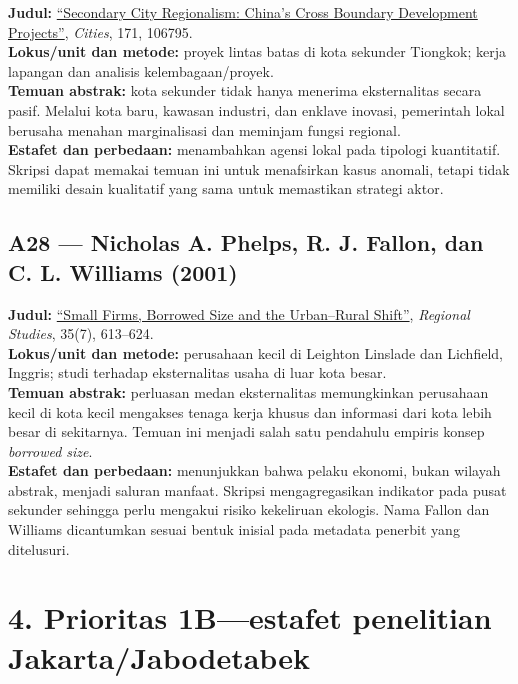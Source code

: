 \documentclass[
  indonesian,
  11pt,
  a4paper,
  oneside,
  openany]{report}
\begin{document}
\textbf{Judul:}
\href{https://doi.org/10.1016/j.cities.2026.106795}{``Secondary City
Regionalism: China's Cross Boundary Development Projects''},
\emph{Cities}, 171, 106795.\\
\textbf{Lokus/unit dan metode:} proyek lintas batas di kota sekunder
Tiongkok; kerja lapangan dan analisis kelembagaan/proyek.\\
\textbf{Temuan abstrak:} kota sekunder tidak hanya menerima
eksternalitas secara pasif. Melalui kota baru, kawasan industri, dan
enklave inovasi, pemerintah lokal berusaha menahan marginalisasi dan
meminjam fungsi regional.\\
\textbf{Estafet dan perbedaan:} menambahkan agensi lokal pada tipologi
kuantitatif. Skripsi dapat memakai temuan ini untuk menafsirkan kasus
anomali, tetapi tidak memiliki desain kualitatif yang sama untuk
memastikan strategi aktor.

\subsection{A28 --- Nicholas A. Phelps, R. J. Fallon, dan C. L. Williams
(2001)}\label{a28-nicholas-a.-phelps-r.-j.-fallon-dan-c.-l.-williams-2001}

\textbf{Judul:} \href{https://doi.org/10.1080/00343400120075885}{``Small
Firms, Borrowed Size and the Urban--Rural Shift''}, \emph{Regional
Studies}, 35(7), 613--624.\\
\textbf{Lokus/unit dan metode:} perusahaan kecil di Leighton Linslade
dan Lichfield, Inggris; studi terhadap eksternalitas usaha di luar kota
besar.\\
\textbf{Temuan abstrak:} perluasan medan eksternalitas memungkinkan
perusahaan kecil di kota kecil mengakses tenaga kerja khusus dan
informasi dari kota lebih besar di sekitarnya. Temuan ini menjadi salah
satu pendahulu empiris konsep \emph{borrowed size}.\\
\textbf{Estafet dan perbedaan:} menunjukkan bahwa pelaku ekonomi, bukan
wilayah abstrak, menjadi saluran manfaat. Skripsi mengagregasikan
indikator pada pusat sekunder sehingga perlu mengakui risiko kekeliruan
ekologis. Nama Fallon dan Williams dicantumkan sesuai bentuk inisial
pada metadata penerbit yang ditelusuri.

\section{4. Prioritas 1B---estafet penelitian
Jakarta/Jabodetabek}\label{prioritas-1bestafet-penelitian-jakartajabodetabek}
\end{document}
